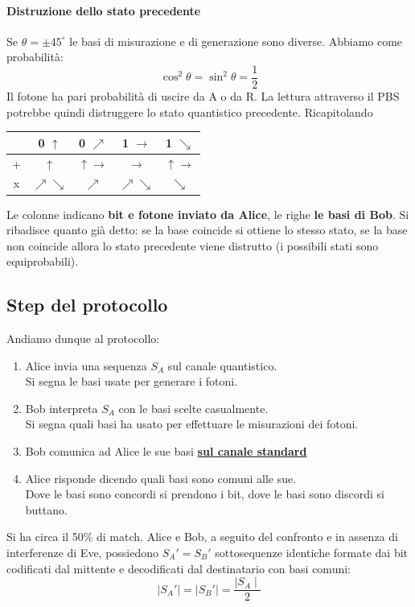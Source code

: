 \paragraph{Distruzione dello stato precedente} Se $\theta = \pm45^{\circ}$ le basi di misurazione e di generazione sono diverse. Abbiamo come probabilità:
$$\cos^2\theta = \sin^2\theta = \frac{1}{2}$$
Il fotone ha pari probabilità di uscire da A o da R. La lettura attraverso il PBS potrebbe quindi distruggere lo stato quantistico precedente. Ricapitolando
\begin{center}
    \begin{tabular}{c|c|c|c|c}
        & 0 $\uparrow$ & 0 $\nearrow$ & 1 $\rightarrow$ & 1 $\searrow$ \\
        \hline
        + & $\uparrow$ & $\uparrow \rightarrow$ & $\rightarrow$ & $\uparrow \rightarrow$  \\
        x & $\nearrow \searrow$ & $\nearrow$ & $\nearrow \searrow$ & $\searrow$
    \end{tabular}
\end{center}
Le colonne indicano \textbf{bit e fotone inviato da Alice}, le righe \textbf{le basi di Bob}. Si ribadisce quanto già detto: se la base coincide si ottiene lo stesso stato, se la base non coincide allora lo stato precedente viene distrutto (i possibili stati sono equiprobabili). 
\subsection{Step del protocollo} 
Andiamo dunque al protocollo:
\begin{enumerate}
    \item Alice invia una sequenza $S_A$ sul canale quantistico.\\ Si segna le basi usate per generare i fotoni.
    \item Bob interpreta $S_A$ con le basi scelte casualmente.\\ Si segna quali basi ha usato per effettuare le misurazioni dei fotoni.
    \item Bob comunica ad Alice le sue basi \textbf{\underline{sul canale standard}}
    \item Alice risponde dicendo quali basi sono comuni alle sue.\\Dove le basi sono concordi si prendono i bit, dove le basi sono discordi si buttano.
\end{enumerate}
Si ha circa il 50\% di match. Alice e Bob, a seguito del confronto e in assenza di interferenze di Eve, possiedono $S_A' = S_B'$ sottosequenze identiche formate dai bit codificati dal mittente e decodificati dal destinatario con basi comuni:
$$ \mid S_A' \mid = \mid S_B' \mid = \frac{\mid S_A \mid}{2} $$

